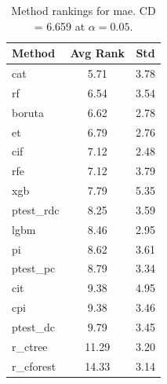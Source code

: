 \begin{table}[h]
\centering
\caption{Method rankings for mae. CD = 6.659 at $\alpha=0.05$.}
\label{tab:ranks_mae}
\begin{tabular}{lcc}
\toprule
Method & Avg Rank & Std \\
\midrule
cat & 5.71 & 3.78 \\
rf & 6.54 & 3.54 \\
boruta & 6.62 & 2.78 \\
et & 6.79 & 2.76 \\
cif & 7.12 & 2.48 \\
rfe & 7.12 & 3.79 \\
xgb & 7.79 & 5.35 \\
ptest_rdc & 8.25 & 3.59 \\
lgbm & 8.46 & 2.95 \\
pi & 8.62 & 3.61 \\
ptest_pc & 8.79 & 3.34 \\
cit & 9.38 & 4.95 \\
cpi & 9.38 & 3.46 \\
ptest_dc & 9.79 & 3.45 \\
r_ctree & 11.29 & 3.20 \\
r_cforest & 14.33 & 3.14 \\
\bottomrule
\end{tabular}
\end{table}